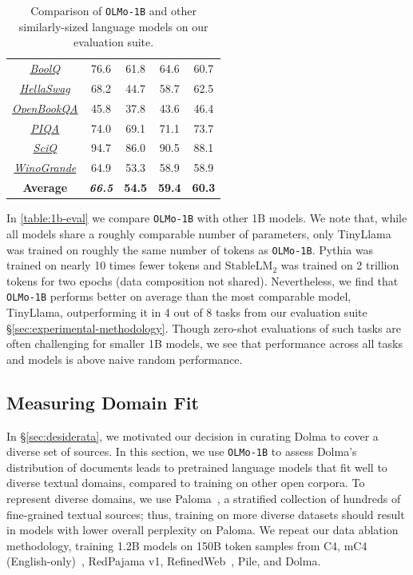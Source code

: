 \documentclass{article}
\newcommand{\dolma}{Dolma\xspace}
\newcommand{\OlmoTiny}{\texttt{OLMo-1B}\xspace}
\begin{document}
\begin{table}[h!]
\begin{tabular}{c@{}c@{}c@{}c@{}c}
    {\textit{\hyperlink{cite.clark2019boolq}{BoolQ}}} & 76.6 & 61.8 & 64.6 & {\color{VarnishBravoThree}60.7} \\
    {\textit{\hyperlink{cite.zellers2019hellaswag}{HellaSwag}}} & 68.2 & 44.7 & 58.7 & {\color{VarnishBravoThree}62.5} \\
    {\textit{\hyperlink{cite.openbookqa}{OpenBookQA}}} & 45.8 & 37.8 & 43.6 & {\color{VarnishBravoThree}46.4} \\
    {\textit{\hyperlink{cite.piqa}{PIQA}}} & 74.0 & 69.1 & 71.1 & {\color{VarnishBravoThree}73.7} \\
    {\textit{\hyperlink{cite.sciq}{SciQ}}} & 94.7 & 86.0 & 90.5 & {\color{VarnishBravoThree}88.1} \\
    {\textit{\hyperlink{cite.winogrande}{WinoGrande}}} & 64.9 & 53.3 & 58.9 & {\color{VarnishBravoThree}58.9} \\
    \midrule
    \textbf{Average} & \textbf{\textit{66.5}} & \textbf{54.5} & \textbf{59.4} & {\color{VarnishBravoThree}\textbf{60.3}} \\
    \bottomrule
    \end{tabular}
    \vspace{1em}
    \caption{
        Comparison of \OlmoTiny and other similarly-sized language models on our evaluation suite. 
    }
    \label{table:1b-eval}
\end{table}

In \autoref{table:1b-eval} we compare \OlmoTiny with other 1B models. 
We note that, while all models share a roughly comparable number of parameters, only TinyLlama was trained on roughly the same number of tokens as \OlmoTiny.
Pythia was trained on nearly 10 times fewer tokens and 
$\text{StableLM}_2$ was trained on 2 trillion tokens for two epochs (data composition not shared).
Nevertheless, we find that \OlmoTiny performs better on average than the most comparable model, TinyLlama, outperforming it in 4 out of 8 tasks from our evaluation suite \S\ref{sec:experimental-methodology}. 
Though zero-shot evaluations of such tasks are often challenging for smaller 1B models, we see that performance across all tasks and models is above naive random performance.

\subsection{Measuring Domain Fit}
\label{sec:ppl_eval}

In \S\ref{sec:desiderata}, we motivated our decision in curating \dolma to cover a diverse set of sources.
In this section, we use \OlmoTiny to assess \dolma's distribution of documents leads to pretrained language models that fit well to diverse textual domains, compared to training on other open corpora.
To represent diverse domains, we use Paloma~\citep{paloma}, a stratified collection of hundreds of fine-grained textual sources; thus, training on more diverse datasets should result in models with lower overall perplexity on Paloma. 
We repeat our data ablation methodology, training 1.2B models on 150B token samples from C4, mC4 (English-only)~\citep{mc4}, RedPajama v1, RefinedWeb~\citep{falcon40b}, Pile, and \dolma.
\end{document}
